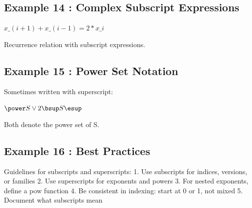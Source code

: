 \documentclass[a4paper,10pt,fleqn]{article}
\begin{document}
\bigskip

\subsection*{Example 14 : Complex Subscript Expressions}

\noindent
$x\_(i + 1) + x\_(i - 1) = 2 * x\_i$


\noindent Recurrence relation with subscript expressions.

\bigskip

\subsection*{Example 15 : Power Set Notation}

\noindent Sometimes written with superscript:

\bigskip

\noindent
$\power S \lor 2 \bsup S \esup$


\noindent Both denote the power set of S.

\bigskip

\subsection*{Example 16 : Best Practices}

\noindent Guidelines for subscripts and superscripts: 1. Use subscripts for indices, versions, or families 2. Use superscripts for exponents and powers 3. For nested exponents, define a pow function 4. Be consistent in indexing: start at 0 or 1, not mixed 5. Document what subscripts mean

\bigskip
\end{document}
